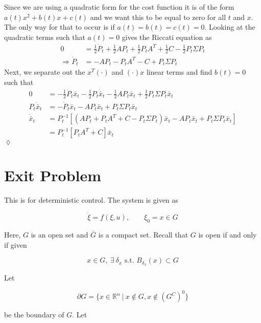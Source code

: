 \begin{example}
Since we are using a quadratic form for the cost function it is of the form $a(t)x^2+b(t)x+c(t)$ and we want this to be equal to zero for all $t$ and $x$.
The only way for that to occur is if $a(t)=b(t)=c(t)=0$.
Looking at the quadratic terms such that $a(t)=0$ gives the Riccati equation as
\begin{align*}
0 &= \tfrac{1}{2}\dot{P}_t + \tfrac{1}{2}AP_t + \tfrac{1}{2}P_t A^T + \tfrac{1}{2}C - \tfrac{1}{2}P_t\Sigma P_t \\
\Rightarrow \dot{P}_t &= -AP_t - P_t A^T - C + P_t \Sigma P_t
\end{align*}
Next, we separate out the $x^T(\cdot)$ and $(\cdot)x$ linear terms and find $b(t) = 0$ such that
\begin{align*}
0 &= -\tfrac{1}{2}\dot{P}_t\bar{x}_t - \tfrac{1}{2}P_t\dot{\bar{x}}_t - \tfrac{1}{2}AP_t\bar{x}_t + \tfrac{1}{2}P_t\Sigma P_t\bar{x}_t \\
P_t\dot{\bar{x}}_t &= -\dot{P}_t\bar{x}_t - AP_t\bar{x}_t + P_t\Sigma P_t\bar{x}_t \\
\dot{\bar{x}}_t &= P_t^{-1}\left[ (AP_t+P_t A^T+C-P_t \Sigma P_t)\bar{x}_t - AP_t\bar{x}_t + P_t\Sigma P_t\bar{x}_t \right] \\
&= P_t^{-1}\left[P_t A^T + C\right] \bar{x}_t
\end{align*}
$\lozenge$
\end{example}

\section{Exit Problem}
This is for deterministic control.
The system is given as

\begin{equation*}
\dot{\xi} = f(\xi,u), \qquad \xi_0 = x\in G
\end{equation*}

Here, $G$ is an open set and $\bar{G}$ is a compact set.
Recall that $G$ is open if and only if given

\begin{equation*}
x\in G,~\exists~\delta_x \text{~s.t.~} B_{\delta_x}(x)\subset G
\end{equation*}

Let

\begin{equation*}
\partial G = \{x\in\mathbb{R}^n~|~x\notin G, x\notin{(G^C)}^0\}
\end{equation*}

be the boundary of $G$.
Let

